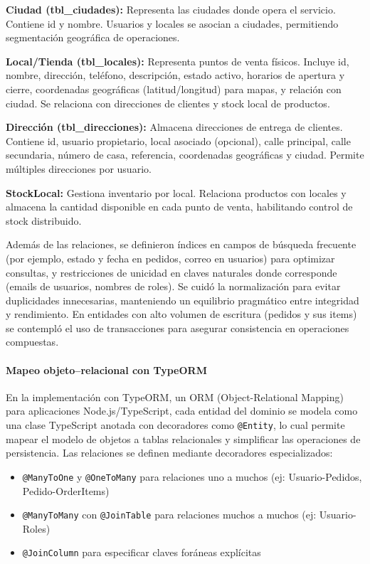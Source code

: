   \textbf{Ciudad (tbl\_ciudades):} Representa las ciudades donde opera el servicio. Contiene id y nombre. Usuarios y locales se asocian a ciudades, permitiendo segmentación geográfica de operaciones.

  \textbf{Local/Tienda (tbl\_locales):} Representa puntos de venta físicos. Incluye id, nombre, dirección, teléfono, descripción, estado activo, horarios de apertura y cierre, coordenadas geográficas (latitud/longitud) para mapas, y relación con ciudad. Se relaciona con direcciones de clientes y stock local de productos.

  \textbf{Dirección (tbl\_direcciones):} Almacena direcciones de entrega de clientes. Contiene id, usuario propietario, local asociado (opcional), calle principal, calle secundaria, número de casa, referencia, coordenadas geográficas y ciudad. Permite múltiples direcciones por usuario.

  \textbf{StockLocal:} Gestiona inventario por local. Relaciona productos con locales y almacena la cantidad disponible en cada punto de venta, habilitando control de stock distribuido.

  Además de las relaciones, se definieron índices en campos de búsqueda frecuente (por ejemplo, estado y fecha en pedidos, correo en usuarios) para optimizar consultas, y restricciones de unicidad en claves naturales donde corresponde (emails de usuarios, nombres de roles). Se cuidó la normalización para evitar duplicidades innecesarias, manteniendo un equilibrio pragmático entre integridad y rendimiento. En entidades con alto volumen de escritura (pedidos y sus items) se contempló el uso de transacciones para asegurar consistencia en operaciones compuestas.

  \paragraph{Mapeo objeto--relacional con TypeORM}
  En la implementación con TypeORM, un ORM (Object-Relational Mapping) para aplicaciones Node.js/TypeScript, cada entidad del dominio se modela como una clase TypeScript anotada con decoradores como \texttt{@Entity}, lo cual permite mapear el modelo de objetos a tablas relacionales y simplificar las operaciones de persistencia. Las relaciones se definen mediante decoradores especializados:
  \begin{itemize}
    \item \texttt{@ManyToOne} y \texttt{@OneToMany} para relaciones uno a muchos (ej: Usuario-Pedidos, Pedido-OrderItems)
    \item \texttt{@ManyToMany} con \texttt{@JoinTable} para relaciones muchos a muchos (ej: Usuario-Roles)
    \item \texttt{@JoinColumn} para especificar claves foráneas explícitas
  \end{itemize}

